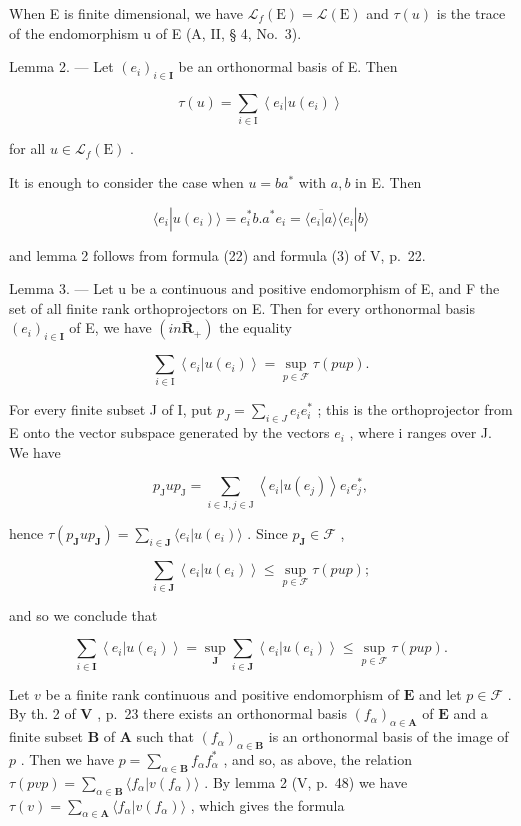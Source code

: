 When E is finite dimensional, we have \(\mathcal{L}_{f}(\mathrm{E}) = \mathcal{L}(\mathrm{E})\) and \(\tau(u)\) is the trace of the endomorphism u of E (A, II, § 4, No.~3).

Lemma 2. --- Let \((e_i)_{i\in \mathbf{I}}\) be an orthonormal basis of E. Then

\[
\tau (u) = \sum_ {i \in \mathrm{I}} \left\langle e _ {i} | u (e _ {i}) \right\rangle
\]

for all \(u \in \mathcal{L}_f(\mathrm{E})\) .

It is enough to consider the case when \(u = ba^{*}\) with \(a, b\) in E. Then

\[
\langle e _ {i} | u (e _ {i}) \rangle = e _ {i} ^ {*} b. a ^ {*} e _ {i} = \overline {{\langle e _ {i} | a \rangle}} \langle e _ {i} | b \rangle
\]

and lemma 2 follows from formula (22) and formula (3) of V, p.~22.

Lemma 3. --- Let u be a continuous and positive endomorphism of E, and F the set of all finite rank orthoprojectors on E. Then for every orthonormal basis \((e_{i})_{i\in\mathbf{I}}\) of E, we have \((in\overline{\mathbf{R}}_{+})\) the equality

\[
\sum_ {i \in \mathrm{I}} \left\langle e _ {i} | u (e _ {i}) \right\rangle = \sup _ {p \in \mathcal {F}} \tau (p u p).
\]

For every finite subset J of I, put \(p_{J} = \sum_{i \in J} e_{i} e_{i}^{*}\) ; this is the orthoprojector from E onto the vector subspace generated by the vectors \(e_{i}\) , where i ranges over J. We have

\[
p _ {\mathrm{J}} u p _ {\mathrm{J}} = \sum_ {i \in \mathrm{J}, j \in \mathrm{J}} \left\langle e _ {i} | u (e _ {j}) \right\rangle e _ {i} e _ {j} ^ {*},
\]

hence \(\tau(p_{\mathbf{J}}up_{\mathbf{J}}) = \sum_{i\in \mathbf{J}}\langle e_i|u(e_i)\rangle\) . Since \(p_{\mathbf{J}}\in \mathcal{F}\) ,

\[
\sum_ {i \in \mathbf {J}} \left\langle e _ {i} | u (e _ {i}) \right\rangle \leqslant \sup _ {p \in \mathcal {F}} \tau (p u p);
\]

and so we conclude that

\[
\sum_ {i \in \mathbf {I}} \left\langle e _ {i} | u (e _ {i}) \right\rangle = \sup _ {\mathbf {J}} \sum_ {i \in \mathbf {J}} \left\langle e _ {i} | u (e _ {i}) \right\rangle \leqslant \sup _ {p \in \mathcal {F}} \tau (p u p).
\]

Let \(v\) be a finite rank continuous and positive endomorphism of \(\mathbf{E}\) and let \(p \in \mathcal{F}\) . By th. 2 of \(\mathbf{V}\) , p.~23 there exists an orthonormal basis \((f_{\alpha})_{\alpha \in \mathbf{A}}\) of \(\mathbf{E}\) and a finite subset \(\mathbf{B}\) of \(\mathbf{A}\) such that \((f_{\alpha})_{\alpha \in \mathbf{B}}\) is an orthonormal basis of the image of \(p\) . Then we have \(p = \sum_{\alpha \in \mathbf{B}} f_{\alpha} f_{\alpha}^{*}\) , and so, as above, the relation \(\tau(pvp) = \sum_{\alpha \in \mathbf{B}} \langle f_{\alpha}|v(f_{\alpha}) \rangle\) . By lemma 2 (V, p.~48) we have \(\tau(v) = \sum_{\alpha \in \mathbf{A}} \langle f_{\alpha}|v(f_{\alpha}) \rangle\) , which gives the formula

